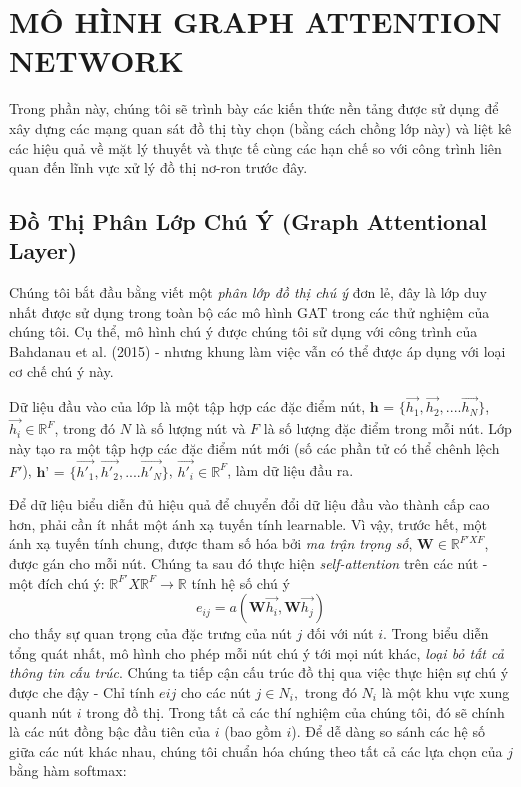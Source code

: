 \chapter{MÔ HÌNH GRAPH ATTENTION NETWORK}
\label{chap:MÔ HÌNH GRAPH ATTENTION NETWORK}


Trong phần này, chúng tôi sẽ trình bày các kiến thức nền tảng được sử dụng để xây dựng các mạng quan sát đồ thị tùy chọn (bằng cách chồng lớp này) và liệt kê các hiệu quả về mặt lý thuyết và thực tế cùng các hạn chế so với công trình liên quan đến lĩnh vực xử lý đồ thị nơ-ron trước đây.

\section{Đồ Thị Phân Lớp Chú Ý (Graph Attentional Layer)}
\label{sec:Đồ Thị Phân Lớp Chú Ý (Graph Attentional Layer)}

Chúng tôi bắt đầu bằng viết một \emph{phân lớp đồ thị chú ý} đơn lẻ, đây là lớp duy nhất được sử dụng trong toàn bộ các mô hình GAT trong các thử nghiệm của chúng tôi. Cụ thể, mô hình chú ý được chúng tôi sử dụng  với công trình của Bahdanau et al. (2015) - nhưng khung làm việc vẫn có thể được áp dụng với loại cơ chế chú ý này.

Dữ liệu đầu vào của lớp là một tập hợp các đặc điểm nút, 
\(\textbf{h = } \{\vec{h_1}, \vec{h_2}, .... \vec{h_N} \}\), 
\(\vec{h_i} \in \mathbb{R}^F\),
trong đó $N$ là số lượng nút và $F$ là số lượng đặc điểm trong mỗi nút. 
Lớp này tạo ra một tập hợp các đặc điểm nút mới (số các phần tử có thể chênh lệch $F'$), 
$\textbf{h' = } \{\vec{h'_1}, \vec{h'_2}, .... \vec{h'_N} \}$, $\vec{h'_i} \in \mathbb{R}^F $,
làm dữ liệu đầu ra.

Để dữ liệu biểu diễn đủ hiệu quả để chuyển đổi dữ liệu đầu vào thành cấp cao hơn, phải cần ít nhất một ánh xạ tuyến tính learnable. Vì vậy, trước hết, một ánh xạ tuyến tính chung, được tham số hóa bởi \textit{ma trận trọng số}, 
\(\textbf{W} \in {\mathbb{R}^{F' X F}}\), 
được gán cho mỗi nút. Chúng ta sau đó thực hiện \emph{self-attention} trên các nút - một đích chú ý: 
\(\mathbb{R}^{F'} X \mathbb{R}^{F} \to \mathbb{R}\) 
tính hệ số chú ý
\[ e_{ij} = a(\textbf{W}\vec{h_i}, \textbf{W}\vec{h_j}) \]
cho thấy sự quan trọng của đặc trưng của nút $j$ đối với nút $i$. Trong biểu diễn tổng quát nhất, mô hình cho phép mỗi nút chú ý tới mọi nút khác, \textit{loại bỏ tất cả thông tin cấu trúc}. Chúng ta tiếp cận cấu trúc đồ thị qua việc thực hiện sự chú ý được che đậy - Chỉ tính $eij$ cho các nút $j \in N_i,$ trong đó $N_i$ là một khu vực xung quanh nút $i$ trong đồ thị. Trong tất cả các thí nghiệm của chúng tôi, đó sẽ chính là các nút đồng bậc đầu tiên của $i$ (bao gồm $i$). Để dễ dàng so sánh các hệ số giữa các nút khác nhau, chúng tôi chuẩn hóa chúng theo tất cả các lựa chọn của $j$ bằng hàm softmax:


